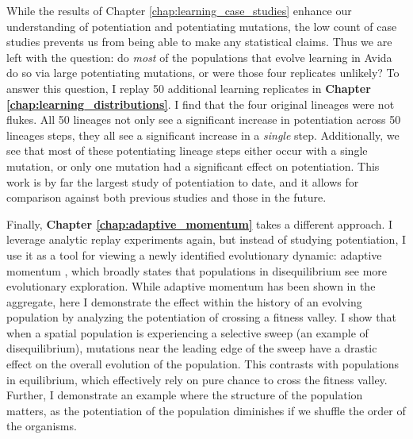While the results of Chapter \ref{chap:learning_case_studies} enhance our understanding of potentiation and potentiating mutations, the low count of case studies prevents us from being able to make any statistical claims.
Thus we are left with the question: do \textit{most} of the populations that evolve learning in Avida do so via large potentiating mutations, or were those four replicates unlikely? 
To answer this question, I replay 50 additional learning replicates in \textbf{Chapter \ref{chap:learning_distributions}}. 
I find that the four original lineages were not flukes. 
All 50 lineages not only see a significant increase in potentiation across 50 lineages steps, they all see a significant increase in a \textit{single} step. 
Additionally, we see that most of these potentiating lineage steps either occur with a single mutation, or only one mutation had a significant effect on potentiation. 
This work is by far the largest study of potentiation to date, and it allows for comparison against both previous studies and those in the future. 

Finally, \textbf{Chapter \ref{chap:adaptive_momentum}} takes a different approach. 
I leverage analytic replay experiments again, but instead of studying potentiation, I use it as a tool for viewing a newly identified evolutionary dynamic: adaptive momentum \citep{Bohm2024.04.08.588357}, which broadly states that populations in disequilibrium see more evolutionary exploration. 
While adaptive momentum has been shown in the aggregate, here I demonstrate the effect within the history of an evolving population by analyzing the potentiation of crossing a fitness valley.  
I show that when a spatial population is experiencing a selective sweep (an example of disequilibrium), mutations near the leading edge of the sweep have a drastic effect on the overall evolution of the population. 
This contrasts with populations in equilibrium, which effectively rely on pure chance to cross the fitness valley.
Further, I demonstrate an example where the structure of the population matters, as the potentiation of the population diminishes if we shuffle the order of the organisms. 

